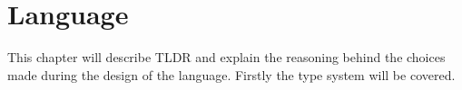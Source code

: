 \chapter{Language}\label{part:design}

This chapter will describe TLDR and explain the reasoning behind the choices made during the design of the language. Firstly the type system will be covered.












